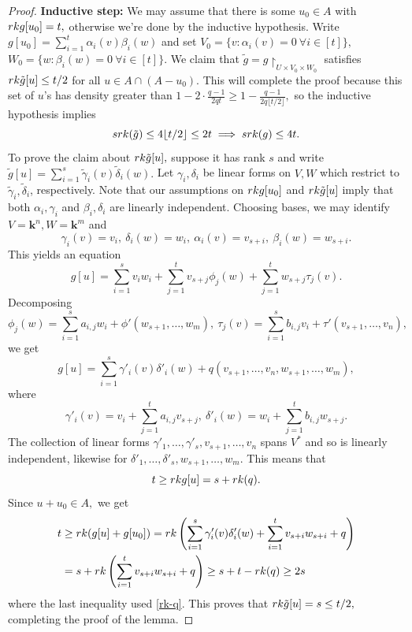 \documentclass[10pt,a4paper]{amsart}
\newcommand{\rk}{\textnormal{rk}}
\newcommand{\srk}{\textnormal{srk}}
\renewcommand{\k}{{\mathbf{k}}}
\begin{document}
\begin{proof}
         
         \textbf{Inductive step:} We may assume that there is some $u_0\in A$ with $\rk g[u_0] = t,$ otherwise we're done by the inductive hypothesis. Write $g[u_0] = \sum_{i=1}^t \alpha_i(v)\beta_i(w)$ and set $V_0 = \{v:\alpha_i(v) = 0\ \forall i\in[t]\},$ $W_0 = \{w:\beta_i(w) = 0\ \forall i\in[t]\}.$ We claim that $\tilde g = g\restriction_{U\times V_0\times W_0}$ satisfies $\rk \tilde g[u] \le t/2 $ for all $u\in A\cap (A-u_0).$ This will complete the proof because this set of $u$'s has density greater than $ 1-2\cdot \frac{q-1}{2qt} \ge 1- \frac{q-1}{2q\lfloor t/2\rfloor}, $ so the inductive hypothesis implies 
         \[
         \srk (\tilde g) \le 4\lfloor t/2\rfloor \le 2t \implies \srk(g) \le 4t.
         \]
        To prove the claim about $\rk \tilde g[u],$ suppose it has rank $s$ and write $\tilde g[u] = \sum_{i=1}^s \tilde\gamma_i(v) \tilde \delta_i(w).$ Let $\gamma_i,\delta_i$ be linear forms on $V,W$ which restrict to $\tilde\gamma_i,\tilde\delta_i$, respectively.  Note that our assumptions on $\rk g[u_0]$ and $\rk \tilde g[u]$ imply that  both $\alpha_i,\gamma_i$ and  $\beta_i,\delta_i$ are linearly independent. Choosing bases, we may identify $V=\k^n,W=\k^m$ and 
        $$ \gamma_i(v) = v_i,\ \delta_i(w) = w_i,\  \alpha_i(v) = v_{s+i},\ \beta_i(w) = w_{s+i}.$$ This yields an equation
         \[
         g[u] = \sum_{i=1}^s v_iw_i +\sum_{j=1}^t  v_{s+j} \phi_j (w)+\sum_{j=1}^t  w_{s+j} \tau_j (v).
         \]
         Decomposing $$\phi_j(w) = \sum_{i=1}^s a_{i,j} w_i + \phi'(w_{s+1},\ldots,w_m),\ \tau_j(v) = \sum_{i=1}^s b_{i,j} v_i + \tau'(v_{s+1},\ldots,v_n),$$ 
         we get 
         \[
         g[u] = \sum_{i=1}^s  \gamma'_i(v) \delta'_i(w) +q(v_{s+1},\ldots,v_n,w_{s+1},\ldots,w_m),
         \]
         where 
         \[
         \gamma'_i(v) = v_i+\sum_{j=1}^t a_{i,j} v_{s+j},\ \delta'_i(w)= w_i+\sum_{j=1}^t b_{i,j} w_{s+j}.
         \]
         The collection of linear forms $\gamma'_1,\ldots,\gamma'_s,v_{s+1},\ldots,v_n$ spans $V^*$ and so is linearly independent, likewise for $\delta'_1,\ldots,\delta'_s,w_{s+1},\ldots,w_m.$ This means that 
         \begin{equation}\label{rk-q}
             t\ge \rk g[u] = s+ \rk(q).
         \end{equation}
         Since $u+u_0\in A,$ we get 
         \begin{align*}
             t &\ge \rk(g[u]+g[u_0]) = \rk \left(\sum_{i=1}^s  \gamma'_i(v) \delta'_i(w)+\sum_{i=1}^t v_{s+i} w_{s+i}+q\right) \\
             &= s+\rk\left(\sum_{i=1}^t v_{s+i} w_{s+i}+q\right) \ge s+t-\rk(q) \ge 2s
         \end{align*}
         where the last inequality used \eqref{rk-q}. This proves that $\rk\tilde g[u] = s\le t/2,$ completing the proof of the lemma.
    \end{proof}
\end{document}
